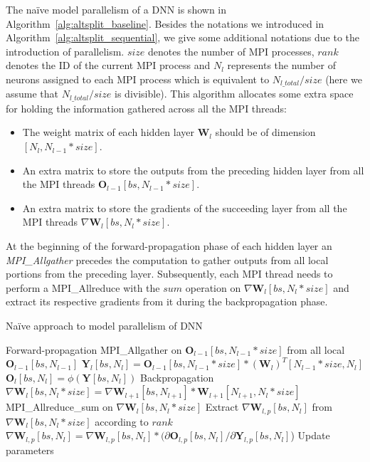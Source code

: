 The na\"{i}ve model parallelism of a DNN is shown in 
Algorithm~\ref{alg:altsplit_baseline}. Besides the notations we introduced in 
Algorithm~\ref{alg:altsplit_sequential}, we give some additional notations due 
to the introduction of parallelism. $size$ denotes the number of MPI processes, 
$rank$ denotes the ID of the current MPI process and $N_l$ represents the number 
of neurons assigned to each MPI process which is equivalent to 
$N_{l\_total}/size$ (here we assume that $N_{l\_total}/size$ is divisible). This 
algorithm allocates some extra space for holding the information gathered across 
all the MPI threads: 
\begin{itemize}
    \item The weight matrix of each hidden layer $\pmb{W}_l$ should be of dimension 
        $[N_l, N_{l-1}*size]$.
    \item An extra matrix to store the outputs from the preceding hidden layer 
        from all the MPI threads $\pmb{O}_{l-1}[bs, N_{l-1}*size]$.
    \item An extra matrix to store the gradients of the succeeding layer from all 
        the MPI threads $\nabla \pmb{W}_l[bs, N_l*size]$.
\end{itemize}
At the beginning of the forward-propagation phase of each hidden layer an 
\textit{MPI\_Allgather} precedes the computation to gather outputs from all 
local portions from the preceding layer. Subsequently, each MPI thread needs to 
perform a MPI\_Allreduce with the $sum$ operation on $\nabla \pmb{W}_l[bs, 
N_l*size]$ and extract its respective gradients from it during the 
backpropagation phase.

\begin{algorithm}[H]
\caption{Na\"{i}ve approach to model parallelism of DNN}
\label{alg:altsplit_baseline}
{\fontsize{10}{10}\selectfont
\begin{algorithmic}[1]
    \Comment Forward-propagation 
            \State MPI\_Allgather on $\pmb{O}_{l-1}[bs, N_{l-1}*size]$ from all local $\pmb{O}_{l-1}[bs, N_{l-1}]$
            \State $\pmb{Y}_l[bs, N_l] = \pmb{O}_{l-1}[bs, N_{l-1}*size] * (\pmb{W}_{l})^T[N_{l-1}*size, N_l]$
            \State $\pmb{O}_l[bs, N_l] = \phi(\pmb{Y}[bs, N_l])$
        \EndFor
    \EndFor
    \Comment Backpropagation 
            \State $\nabla \pmb{W}_l[bs, N_l*size]  = \nabla \pmb{W}_{l+1}[bs, N_{l+1}] * \pmb{W}_{l+1}[N_{l+1}, N_l*size]$
            \State MPI\_Allreduce\_sum on  $\nabla \pmb{W}_l[bs, N_l*size]$
            \State Extract $\nabla \pmb{W}_{l,p}[bs, N_l]$ from $\nabla \pmb{W}_l[bs, N_l*size]$ according to $rank$
            \State $\nabla \pmb{W}_{l,p}[bs, N_l] = \nabla \pmb{W}_{l,p}[bs, N_l] * (\partial \pmb{O}_{l,p}[bs, N_l] / \partial \pmb{Y}_{l,p}[bs, N_l]$)
        \EndFor
    \EndFor
        \State Update parameters
    \EndFor
\end{algorithmic}}
\end{algorithm}

